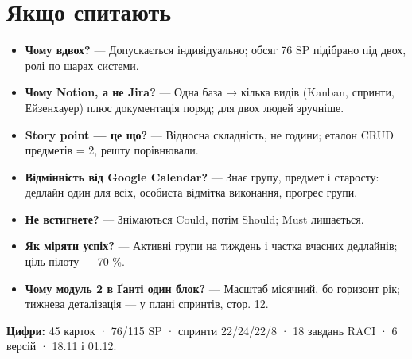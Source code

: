 \documentclass[11pt]{article}
\begin{document}
\section*{Якщо спитають}
\begin{itemize}[leftmargin=1.2em,itemsep=2pt]
  \item \textbf{Чому вдвох?} — Допускається індивідуально; обсяг 76 SP підібрано під двох, ролі по шарах системи.
  \item \textbf{Чому Notion, а не Jira?} — Одна база → кілька видів (Kanban, спринти, Ейзенхауер) плюс документація поряд; для двох людей зручніше.
  \item \textbf{Story point — це що?} — Відносна складність, не години; еталон CRUD предметів = 2, решту порівнювали.
  \item \textbf{Відмінність від Google Calendar?} — Знає групу, предмет і старосту: дедлайн один для всіх, особиста відмітка виконання, прогрес групи.
  \item \textbf{Не встигнете?} — Знімаються Could, потім Should; Must лишається.
  \item \textbf{Як міряти успіх?} — Активні групи на тиждень і частка вчасних дедлайнів; ціль пілоту — 70 \%.
  \item \textbf{Чому модуль 2 в Ґанті один блок?} — Масштаб місячний, бо горизонт рік; тижнева деталізація — у плані спринтів, стор. 12.
\end{itemize}

\textbf{Цифри:} 45 карток · 76/115 SP · спринти 22/24/22/8 · 18 завдань RACI · 6 версій · 18.11 і 01.12.
\end{document}
